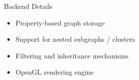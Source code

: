 \begin{frame}{Backend Details}
	\begin{itemize}
		\item Property‑based graph storage
		\item Support for nested subgraphs / clusters
		\item Filtering and inheritance mechanisms
		\item OpenGL rendering engine
	\end{itemize}
\end{frame}